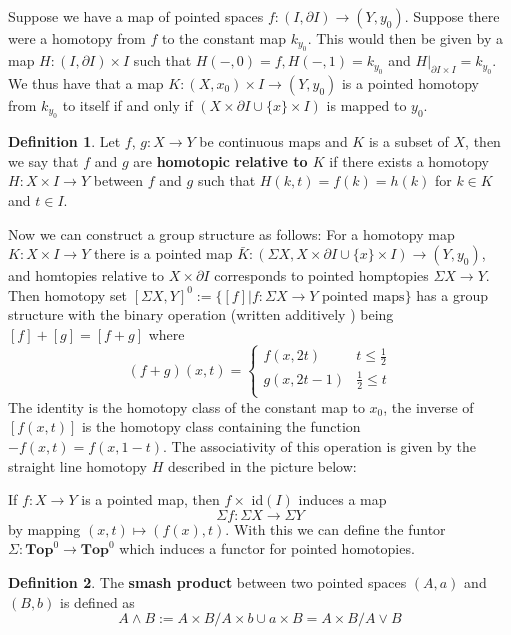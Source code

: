 \documentclass{article}
\theoremstyle{definition}
\newtheorem{defn}{Definition}[section]
\newcommand{\cat}[1]{\mathbf{#1}}
\begin{document}
Suppose we have a map of pointed spaces $f:(I,\partial I)\rightarrow (Y,y_{0})$. Suppose there were a homotopy from $f$ to the constant map $k_{y_{0}}$. This would then be given by a map $H:(I,\partial I)\times I$ such that $H(-,0)=f,H(-,1)=k_{y_{0}}$ and $H|_{\partial I\times I}=k_{y_{0}}.$ We thus have that a map $K:(X,x_{0})\times I\rightarrow (Y,y_{0})$ is a pointed homotopy from $k_{y_{0}}$ to itself if and only if $(X\times\partial I\cup\{x\}\times I)$ is mapped to $y_{0}.$
\begin{defn}
Let $f$, $g: X \rightarrow Y$ be continuous maps and $K$ is a subset of $X$, then we say that $f$ and $g$ are \textbf{homotopic relative to $K$} if there exists a homotopy $H: X\times I \rightarrow Y$ between $f$ and $g$ such that $H(k,t)=f(k)=h(k)$ for $k\in K$ and $t\in I$. 
\end{defn}
Now we can construct a group structure as follows: For a homotopy map $K:X\times I\rightarrow Y$ there is a pointed map $\bar{K}:(\Sigma X, X\times\partial I\cup\{x\}\times I)\rightarrow (Y,y_{0})$, and homtopies relative to $X \times \partial I$ corresponds to pointed homptopies $\Sigma X \rightarrow Y$. Then homotopy set $[\Sigma X, Y]^0:=\{[f]|f: \Sigma X \rightarrow Y \,\, \text{pointed maps} \}$ has a group structure with the binary operation (written additively ) being $[f]+[g]=[f+g]$ where $$(f+g)(x,t)= \begin{cases} 
      f(x,2t) & t\leq \frac{1}{2} \\
      g(x,2t-1) & \frac{1}{2}\leq t \\
   \end{cases}$$
   The identity is the homotopy class of the constant map to $x_0$, the inverse of $[f(x,t)]$ is the homotopy class containing the function $-f(x,t)=f(x,1-t)$. The associativity
of this operation is given by the straight line homotopy $H$ described in the picture below: \begin{center}
\end{center}If $f:X \rightarrow Y$ is a pointed map, then $f \times$ id$(I)$ induces a map  $$\Sigma f: \Sigma X \rightarrow \Sigma Y $$ by mapping $(x,t)\mapsto (f(x),t)$. With this we can define the funtor $\Sigma : \cat{Top}^0 \rightarrow \cat{Top}^0$ which induces a functor for pointed homotopies.  
   \begin{defn}
   The \textbf{smash product} between two pointed spaces $(A,a)$ and $(B,b)$ is defined as $$A \wedge B:= A\times B / A \times b \cup a \times B=A\times B / A \lor B$$
   \end{defn}
\end{document}

